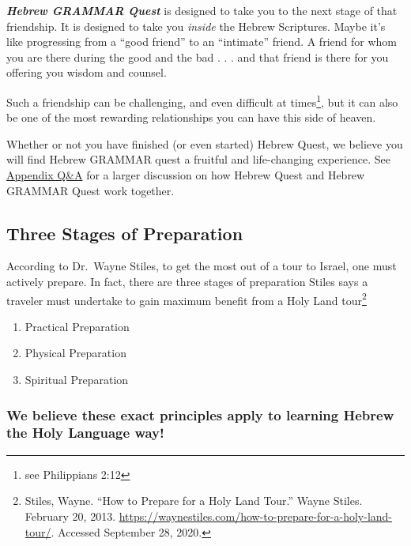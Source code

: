\documentclass[
]{turabian-researchpaper}
\providecommand{\tightlist}{%
  \setlength{\itemsep}{0pt}\setlength{\parskip}{0pt}}
\begin{document}
\textbf{\emph{Hebrew GRAMMAR Quest}} is designed to take you to the next stage of that friendship. It is designed to take you \emph{inside} the Hebrew Scriptures. Maybe it's like progressing from a ``good friend'' to an ``intimate'' friend. A friend for whom you are there during the good and the bad . . . and that friend is there for you offering you wisdom and counsel.

Such a friendship can be challenging, and even difficult at times\footnote{see Philippians 2:12}, but it can also be one of the most rewarding relationships you can have this side of heaven.

Whether or not you have finished (or even started) Hebrew Quest, we believe you will find Hebrew GRAMMAR quest a fruitful and life-changing experience. See \protect\hyperlink{difference}{Appendix Q\&A} for a larger discussion on how Hebrew Quest and Hebrew GRAMMAR Quest work together.

\hypertarget{three-stages-of-preparation}{%
\subsection*{Three Stages of Preparation}\label{three-stages-of-preparation}}

According to Dr.~Wayne Stiles, to get the most out of a tour to Israel, one must actively prepare. In fact, there are three stages of preparation Stiles says a traveler must undertake to gain maximum benefit from a Holy Land tour\footnote{Stiles, Wayne. ``How to Prepare for a Holy Land Tour.'' Wayne Stiles. February 20, 2013. \url{https://waynestiles.com/how-to-prepare-for-a-holy-land-tour/}. Accessed September 28, 2020.}

\begin{enumerate}
\def\labelenumi{\arabic{enumi}.}
\tightlist
\item
  Practical Preparation
\item
  Physical Preparation
\item
  Spiritual Preparation
\end{enumerate}

\hypertarget{we-believe-these-exact-principles-apply-to-learning-hebrew-the-holy-language-way}{%
\subsubsection*{We believe these exact principles apply to learning Hebrew the Holy Language way!}\label{we-believe-these-exact-principles-apply-to-learning-hebrew-the-holy-language-way}}
\end{document}
